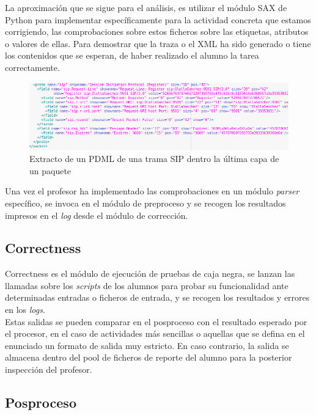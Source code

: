 La aproximación que se sigue para el análisis, es utilizar el módulo SAX de Python para implementar específicamente para la actividad concreta que estamos corrigiendo, las comprobaciones sobre estos ficheros sobre las etiquetas, atributos o valores de ellas. Para demostrar que la traza o el XML ha sido generado o tiene los contenidos que se esperan, de haber realizado el alumno la tarea correctamente.\\


\begin{figure}[H]
   \centering
   \includegraphics[width=16cm]{img/Selection_015_pdml_2}
   \caption{Extracto de un PDML de una trama SIP dentro la última capa de un paquete}
   \label{figura:extracto_pdml}
\end{figure}


Una vez el profesor ha implementado las comprobaciones en un módulo \textit{parser} específico, se invoca en el módulo de preproceso y se recogen los resultados impresos en el \textit{log} desde el módulo de corrección.


\subsection{Correctness}
\label{sec:correctness}


Correctness es el módulo de ejecución de pruebas de caja negra, se lanzan las llamadas sobre los \textit{scripts} de los alumnos para probar su funcionalidad ante determinadas entradas o ficheros de entrada, y se recogen los resultados y errores en los \textit{logs}.\\


Estas salidas se pueden comparar en el posproceso con el resultado esperado por el procesor, en el caso de actividades más sencillas o aquellas que se defina en el enunciado un formato de salida muy estricto. En caso contrario, la salida se almacena dentro del pool de ficheros de reporte del alumno para la posterior inspección del profesor.\\


\subsection{Posproceso}
\label{sec:posproceso}


